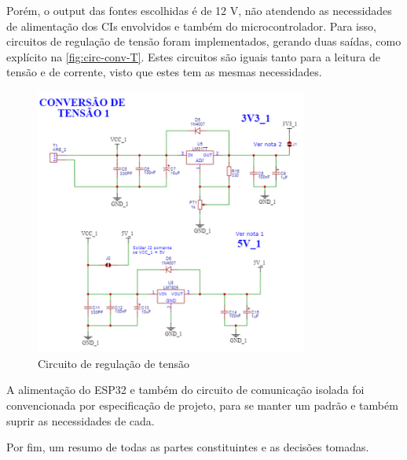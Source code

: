 Porém, o output das fontes escolhidas é de 12 V, não atendendo as necessidades de alimentação dos \gls{CI}s envolvidos e também do microcontrolador. Para isso, circuitos de regulação de tensão foram implementados, gerando duas saídas, como explícito na \autoref{fig:circ-conv-T}. Estes circuitos são iguais tanto para a leitura de tensão e de corrente, visto que estes tem as mesmas necessidades.

\begin{figure}[htb!]
    \caption{Circuito de regulação de tensão}
    \label{fig:circ-conv-T}
    \includegraphics[width=0.8\textwidth]{figuras/circ-conv-T.png}
    \fonte{}
\end{figure}

A alimentação do ESP32 e também do circuito de comunicação isolada foi convencionada por especificação de projeto, para se manter um padrão e também suprir as necessidades de cada.

Por fim, um resumo de todas as partes constituintes e as decisões tomadas.

